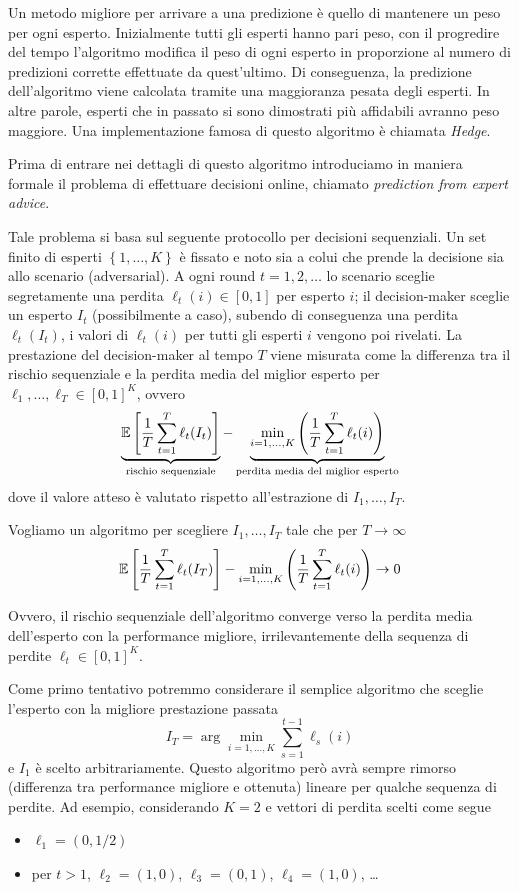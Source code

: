 Un metodo migliore per arrivare a una predizione è quello di mantenere un peso per ogni esperto. Inizialmente tutti gli esperti hanno pari peso, con il progredire del tempo l'algoritmo modifica il peso di ogni esperto in proporzione al numero di predizioni corrette effettuate da quest'ultimo. Di conseguenza, la predizione dell'algoritmo viene calcolata tramite una maggioranza pesata degli esperti. In altre parole, esperti che in passato si sono dimostrati più affidabili avranno peso maggiore. Una implementazione famosa di questo algoritmo è chiamata \textit{Hedge}. 

Prima di entrare nei dettagli di questo algoritmo introduciamo in maniera formale il problema di effettuare decisioni online, chiamato \textit{prediction from expert advice}.

Tale problema si basa sul seguente protocollo per decisioni sequenziali. Un set finito di esperti $\left\{1, \dots, K\right\}$ è fissato e noto sia a colui che prende la decisione sia allo scenario (adversarial). A ogni round $t = 1,2, \dots$ lo scenario sceglie segretamente una perdita $\ell_t (i) \in [0,1]$ per esperto $i$; il decision-maker sceglie un esperto $I_t$ (possibilmente a caso), subendo di conseguenza una perdita $\ell_t (I_t)$, i valori di $\ell_t (i)$ per tutti gli esperti $i$ vengono poi rivelati. La prestazione del decision-maker al tempo $T$ viene misurata come la differenza tra il rischio sequenziale e la perdita media del miglior esperto per $\ell_1, \dots, \ell_T \in [0,1]^K$, ovvero
$$ \underbrace{\mathbb{E} \left[\frac{1}{T} \sum_{t = 1}^T \ell_t (I_t) \right]}_{\text{rischio sequenziale}} - \underbrace{\min_{i = 1, \dots, K} \left(\frac{1}{T} \sum_{t = 1}^T \ell_t (i) \right)}_{\text{perdita media del miglior esperto}} $$
dove il valore atteso è valutato rispetto all'estrazione di $I_1, \dots, I_T$.

Vogliamo un algoritmo per scegliere $I_1, \dots, I_T$ tale che per $T \rightarrow \infty$
$$ \mathbb{E} \left[\frac{1}{T} \sum_{t = 1}^T \ell_t (I_T)\right] - \min_{i = 1, \dots, K} \left(\frac{1}{T} \sum_{t = 1}^T \ell_t (i)\right) \rightarrow 0$$

Ovvero, il rischio sequenziale dell'algoritmo converge verso la perdita media dell'esperto con la performance migliore, irrilevantemente della sequenza di perdite $\ell_t \in [0,1]^K$.

Come primo tentativo potremmo considerare il semplice algoritmo che sceglie l'esperto con la migliore prestazione passata
$$ I_T = \arg \min_{i = 1, \dots, K} \sum_{s = 1}^{t-1} \ell_s (i) $$
e $I_1$ è scelto arbitrariamente. Questo algoritmo però avrà sempre rimorso (differenza tra performance migliore e ottenuta) lineare per qualche sequenza di perdite. Ad esempio, considerando $K = 2$ e vettori di perdita scelti come segue
\begin{itemize}
    \item $\ell_1 = (0, 1/2)$

    \item per $t > 1$, $\ell_2 = (1,0)$, $\ell_3 = (0,1)$, $\ell_4 = (1,0)$, \dots
\end{itemize}

